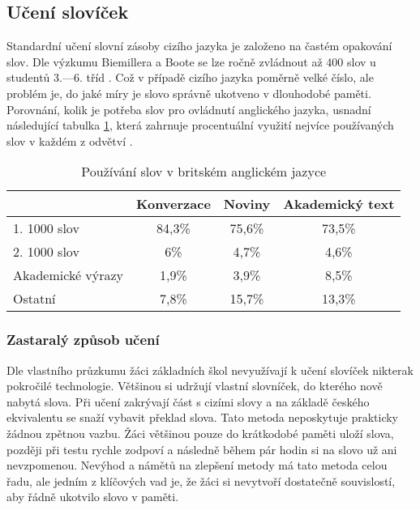 \documentclass[a4paper,11pt,titlepage,fleqn]{article}
\begin{document}
    \subsection{Učení slovíček}
        Standardní učení slovní zásoby cizího jazyka je založeno na častém opakování slov. Dle výzkumu Biemillera a Boote se lze ročně zvládnout až 400 slov u studentů 3.—6. tříd \cite{bib:beimiller}. Což v případě cizího jazyka poměrně velké číslo, ale problém je, do jaké míry je slovo správně ukotveno v dlouhodobé paměti. Porovnání, kolik je potřeba slov pro ovládnutí anglického jazyka, usnadní následující tabulka \ref{tab:english-vocab-usage}, která zahrnuje procentuální využití nejvíce používaných slov v každém z odvětví \cite{bib:learning-vocab}. 

        \begin{table}[ht!]
            \centering
            \begin{tabular}{|l|c|c|c|}
            \hline
            & \multicolumn{1}{l|}{Konverzace} & \multicolumn{1}{l|}{Noviny} & \multicolumn{1}{l|}{Akademický text} \\ \hline
            1. 1000 slov & 84,3\% & 75,6\% & 73,5\% \\ \hline
            2. 1000 slov & 6\% & 4,7\% & 4,6\% \\ \hline
            Akademické výrazy& 1,9\% & 3,9\% & 8,5\% \\ \hline
            Ostatní & 7,8\% & 15,7\% & 13,3\% \\ \hline
            \end{tabular}
            \caption{Používání slov v britském anglickém jazyce}
            \label{tab:english-vocab-usage}
        \end{table}

        \subsubsection{Zastaralý způsob učení}
            Dle vlastního průzkumu žáci základních škol nevyužívají k učení slovíček nikterak pokročilé technologie. Většinou si udržují vlastní slovníček, do kterého nově nabytá slova. Při učení zakrývají část s cizími slovy a na základě českého ekvivalentu se snaží vybavit překlad slova. Tato metoda neposkytuje prakticky žádnou zpětnou vazbu. Žáci většinou pouze do krátkodobé paměti uloží slova, později při testu rychle zodpoví a následně během pár hodin si na slovo už ani nevzpomenou. Nevýhod a námětů na zlepšení metody má tato metoda celou řadu, ale jedním z klíčových vad je, že žáci si nevytvoří dostatečně souvislostí, aby řádně ukotvilo slovo v paměti.
\end{document}
